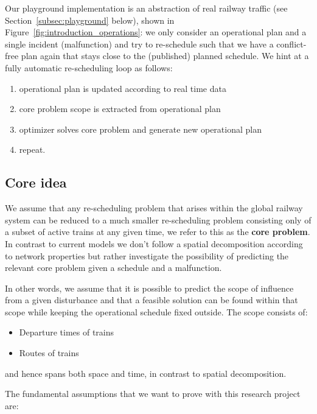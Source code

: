 \documentclass{article}
\begin{document}
Our playground implementation is an abstraction of real railway traffic (see Section~\ref{subsec:playground} below), shown in Figure~\ref{fig:introduction_operations}: we only consider an operational plan and a single incident (malfunction) and try to re-schedule such that we have a conflict-free plan again that stays close to the (published) planned schedule. We hint at a fully automatic re-scheduling loop as follows:

\begin{enumerate}
    \item operational plan is updated according to real time data
    \item core problem scope is extracted from operational plan
    \item optimizer solves core problem and generate new operational plan
    \item repeat.
\end{enumerate}

\subsection{Core idea}\label{subsec:coreidea}

We assume that any re-scheduling problem that arises within the global railway system can be reduced to a much smaller re-scheduling problem consisting only of a subset of active trains at any given time, we refer to this as the \textbf{core problem}. In contrast to current models we don't follow a spatial decomposition according to network properties but rather investigate the possibility of predicting the relevant core problem given a schedule and a malfunction.

In other words, we assume that it is possible to predict the scope of influence from a given disturbance and that a feasible solution can be found within that scope while keeping the operational schedule fixed outside. The scope consists of:
\begin{itemize}
    \item Departure times of trains
    \item Routes of trains
\end{itemize}
and hence spans both space and time, in contrast to spatial decomposition.


The fundamental assumptions that we want to prove with this research project are:
\end{document}
